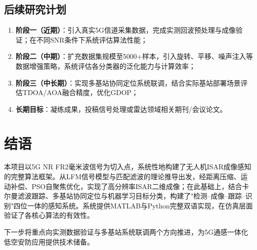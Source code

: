 \documentclass[12pt, a4paper]{article}
\begin{document}
\subsection{后续研究计划}

\begin{enumerate}
  \item \textbf{阶段一（近期）}：引入真实5G信道采集数据，完成实测回波预处理与成像验证；在不同SNR条件下系统评估算法性能；
  \item \textbf{阶段二（中期）}：扩充数据集规模至5000+样本，引入旋转、平移、噪声注入等数据增强策略，系统评估各分类器的泛化能力与计算效率；
  \item \textbf{阶段三（中长期）}：实现多基站协同定位系统联调，结合实际基站部署场景评估TDOA/AOA融合精度，优化GDOP；
  \item \textbf{长期目标}：凝练成果，投稿信号处理或雷达领域相关期刊/会议论文。
\end{enumerate}

\section{结语}

本项目以5G NR FR2毫米波信号为切入点，系统性地构建了无人机ISAR成像感知的完整算法框架。从LFM信号模型与匹配滤波的理论推导出发，经距离压缩、运动补偿、PSO自聚焦优化，实现了高分辨率ISAR二维成像；在此基础上，结合卡尔曼滤波跟踪、多基站协同定位与机器学习目标分类，构建了"检测--成像--跟踪--识别"四位一体的感知系统。系统提供MATLAB与Python完整双语实现，在仿真层面验证了各核心算法的有效性。

下一步将重点向实测数据验证与多基站系统联调两个方向推进，为5G通感一体化低空安防应用提供技术储备。
\end{document}
